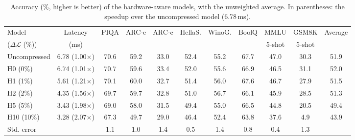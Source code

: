 \documentclass[11pt]{article}
\newcommand{\dloss}{\Delta\mathcal{L}}
\begin{document}
\begin{table}[!ht]
\centering
\small
\setlength{\tabcolsep}{3pt}
\begin{tabular}{lcccccccccc}
\toprule
Model & Latency & PIQA & ARC-e & ARC-c & HellaS. & WinoG. & BoolQ & MMLU & GSM8K & Average \\
($\dloss$ (\%)) & (ms)   &      &       &       &         &        &       & 5-shot & 5-shot & \\
\midrule
Uncompressed & 6.78 (1.00$\times$) & 70.6 & 59.2 & 33.0 & 52.4 & 55.2 & 67.7 & 47.0 & 30.3 & 51.9 \\
\addlinespace
H0  (0\%)    & 6.74 (1.01$\times$) & 70.7 & 59.6 & 33.4 & 52.0 & 55.6 & 66.9 & 46.5 & 31.1 & 52.0 \\
H1  (1\%)    & 5.61 (1.21$\times$) & 70.1 & 60.0 & 32.7 & 51.4 & 56.0 & 67.6 & 46.7 & 27.9 & 51.5 \\
H2  (2\%)    & 4.35 (1.56$\times$) & 69.7 & 59.7 & 32.8 & 51.0 & 56.7 & 66.1 & 45.9 & 28.5 & 51.3 \\
H5  (5\%)    & 3.43 (1.98$\times$) & 69.0 & 58.0 & 31.5 & 49.4 & 55.0 & 66.5 & 44.8 & 20.5 & 49.4 \\
H10 (10\%)   & 3.28 (2.07$\times$) & 67.3 & 49.7 & 29.0 & 46.4 & 52.4 & 63.8 & 37.6 &  4.9 & 43.9 \\
\midrule
Std. error   &      & 1.1  & 1.0  & 1.4  & 0.5  & 1.4  & 0.8  & 0.4  & 1.3  & \\
\bottomrule
\end{tabular}
\caption{Accuracy (\%, higher is better) of the hardware-aware models, with the unweighted average. In parentheses: the speedup over the uncompressed model (6.78\,ms).}
\label{tab:hwresults}
\end{table}
\end{document}

